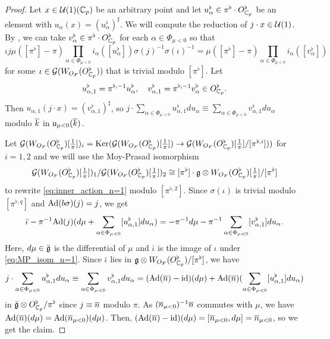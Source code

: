 \documentclass[12pt,reqno]{amsart}
\begin{document}
\begin{proof}
    Let $x \in {\mathcal{U}}(1)(\mathbb{C}_p)$ be an arbitrary point and let $u_\alpha^\flat \in \pi^\flat \cdot O_{\mathbb{C}_p}^\flat$ be an element with $u_\alpha(x) = (u_\alpha^\flat)^\sharp$. We will compute the reduction of $j \cdot x \in {\mathcal{U}}(1)$. By \cite[Proposition 2.15]{Tak25z},  we can take $v_\alpha^\flat \in \pi^\flat \cdot O_{\mathbb{C}_p}^\flat$ for each $\alpha \in \Phi_{\mu < 0}$ so that 
    \begin{equation} \label{eq:inner_action_n=1}
        \iota j \mu([\pi^\flat] - \pi) \prod_{\alpha \in \Phi_{\mu < 0}} i_\alpha([u_\alpha^\flat]) \sigma(j)^{-1} \sigma(\iota)^{-1} = \mu([\pi^\flat] - \pi) \prod_{\alpha \in \Phi_{\mu < 0}} i_\alpha([v_\alpha^\flat])
    \end{equation}
    for some $\iota \in {\mathcal{G}}(W_{O_F}(O_{\mathbb{C}_p}^\flat))$ that is trivial modulo $[\pi^\flat]$. Let 
    \[
        u_{\alpha, 1}^\flat = \pi^{\flat, -1} u_\alpha^\flat, \quad v_{\alpha, 1}^\flat = \pi^{\flat, -1} v_\alpha^\flat \in O_{\mathbb{C}_p}^\flat. 
    \]
    Then $u_{\alpha, 1}(j\cdot x) = (v_{\alpha, 1}^\flat)^\sharp$, so $j \cdot \sum_{\alpha \in \Phi_{\mu < 0}} u_{\alpha, 1}^\flat du_\alpha \equiv \sum_{\alpha \in \Phi_{\mu < 0}} v_{\alpha, 1}^\flat du_\alpha$ modulo ${\overline{k}}$ in ${\mathsf{u}}_{\mu < 0}({\overline{k}})$. 

    Let ${\mathcal{G}}(W_{O_F}(O_{\mathbb{C}_p}^\flat)[\tfrac{1}{\pi}])_i = {\operatorname{Ker}}({\mathcal{G}}(W_{O_F}(O_{\mathbb{C}_p}^\flat)[\tfrac{1}{\pi}]) \to {\mathcal{G}}(W_{O_F}(O_{\mathbb{C}_p}^\flat)[\tfrac{1}{\pi}] / [\pi^{\flat, i}]))$ for $i = 1, 2$ and we will use the Moy-Prasad isomorphism 
    \begin{equation} \label{eq:MP_isom_n=1}
        {\mathcal{G}}(W_{O_F}(O_{\mathbb{C}_p}^\flat)[\tfrac{1}{\pi}])_1 / {\mathcal{G}}(W_{O_F}(O_{\mathbb{C}_p}^\flat)[\tfrac{1}{\pi}])_2 \cong [\pi^\flat] \cdot {\mathfrak{g}} \otimes W_{O_F}(O_{\mathbb{C}_p}^\flat)[\tfrac{1}{\pi}] / [\pi^\flat]
    \end{equation}
    to rewrite \eqref{eq:inner_action_n=1} modulo $[\pi^{\flat, 2}]$. Since $\sigma(\iota)$ is trivial modulo $[\pi^{\flat, q}]$ and ${\operatorname{Ad}}(b\sigma)(j) = j$, we get
    \[
        \bar{\iota} - \pi^{-1} {\operatorname{Ad}}(j)(d\mu + \sum_{\alpha \in \Phi_{\mu < 0}} [u_{\alpha, 1}^\flat] du_\alpha) = -\pi^{-1} d\mu - \pi^{-1} \sum_{\alpha \in \Phi_{\mu < 0}} [v_{\alpha, 1}^\flat] du_\alpha. 
    \] 
    Here, $d\mu \in {\mathfrak{\breve{g}}}$ is the differential of $\mu$ and $\bar{\iota}$ is the image of $\iota$ under \eqref{eq:MP_isom_n=1}. Since $\bar{\iota}$ lies in ${\mathfrak{g}} \otimes W_{O_F}(O_{\mathbb{C}_p}^\flat) / [\pi^\flat]$, we have 
    \[
        j \cdot \sum_{\alpha \in \Phi_{\mu < 0}} u_{\alpha, 1}^\flat du_\alpha \equiv \sum_{\alpha \in \Phi_{\mu < 0}} v_{\alpha, 1}^\flat du_\alpha = ({\operatorname{Ad}}({\overline{n}}) - {\operatorname{id}})(d\mu) + {\operatorname{Ad}}({\overline{n}})(\sum_{\alpha \in \Phi_{\mu < 0}} [u_{\alpha, 1}^\flat] du_\alpha)
    \]
    in $\breve{{\mathfrak{g}}} \otimes O_{\mathbb{C}_p}^\flat / \pi^{\flat}$ since $j \equiv {\overline{n}}$ modulo $\pi$. As $({\overline{n}}_{\mu < 0})^{-1} {\overline{n}}$ commutes with $\mu$, we have ${\operatorname{Ad}}({\overline{n}})(d\mu) = {\operatorname{Ad}}({\overline{n}}_{\mu < 0})(d \mu)$. Then, $({\operatorname{Ad}}({\overline{n}}) - {\operatorname{id}})(d\mu) = [{\overline{n}}_{\mu < 0}, d\mu] = {\overline{n}}_{\mu < 0}$, so we get the claim. 
\end{proof}
\end{document}
